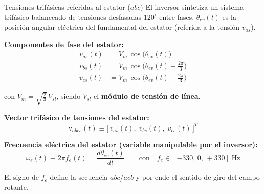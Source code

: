 \documentclass[aspectratio=169,t]{beamer}
\begin{document}
\begin{frame}{Tensiones trifásicas referidas al estator ($abc$)}
{\small\color{uncGray}El inversor sintetiza un sistema trifásico balanceado de tensiones desfasadas $120^\circ$ entre fases. $\theta_{ev}(t)$ es la posición angular eléctrica del fundamental del estator (referida a la tensión $v_{as}$).}\par
\vspace{4mm}

\textbf{Componentes de fase del estator:}
\begin{align*}
v_{as}(t) &= V_m\,\cos\!\big(\theta_{ev}(t)\big) \\
v_{bs}(t) &= V_m\,\cos\!\big(\theta_{ev}(t) - \tfrac{2\pi}{3}\big) \\
v_{cs}(t) &= V_m\,\cos\!\big(\theta_{ev}(t) + \tfrac{2\pi}{3}\big)
\end{align*}

con $V_m = \sqrt{\tfrac{2}{3}}\,V_{sl}$, siendo $V_{sl}$ el \textbf{módulo de tensión de línea}.


\textbf{Vector trifásico de tensiones del estator:}
\begin{equation*}
\bm{\mathrm{v}}_{abcs}(t) \equiv \big[\,v_{as}(t),\;v_{bs}(t),\;v_{cs}(t)\,\big]^T
\end{equation*}

\textbf{Frecuencia eléctrica del estator (variable manipulable por el inversor):}
\begin{equation*}
\omega_e(t) \equiv 2\pi f_e(t) = \frac{d\theta_{ev}(t)}{dt}
\qquad\text{con}\quad f_e\in[-330,\,0,\,+330]\;\text{Hz}
\end{equation*}

{\small El signo de $f_e$ define la secuencia $abc$/$acb$ y por ende el sentido de giro del campo rotante.}
\end{frame}
\end{document}
